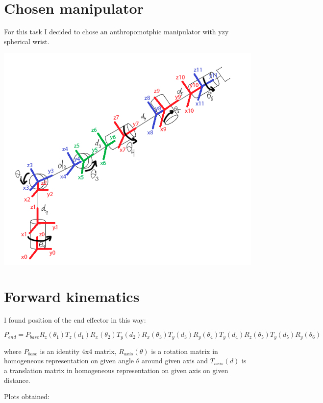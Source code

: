 \documentclass{article}
\begin{document}
    \section*{Chosen manipulator}

    For this task I decided to chose an anthropomotphic manipulator with yzy spherical wrist.

    \includegraphics[width=\linewidth]{manipulator_scheme}

    \section*{Forward kinematics}

    I found position of the end effector in this way:

    $$P_{end} = P_{base} R_z(\theta_1) T_z(d_1) R_x(\theta_2) T_y(d_2) R_x(\theta_3) T_y(d_3) R_y(\theta_4) T_y(d_4) R_z(\theta_5) T_y(d_5) R_y(\theta_6)$$

    where $P_{base}$ is an identity 4x4 matrix, $R_{axis}(\theta)$ is a rotation matrix in homogeneous representation on given angle $\theta$ around given axis and $T_{axis}(d)$ is a translation matrix in homogeneous representation on given axis on given distance.

    Plots obtained:
\end{document}
